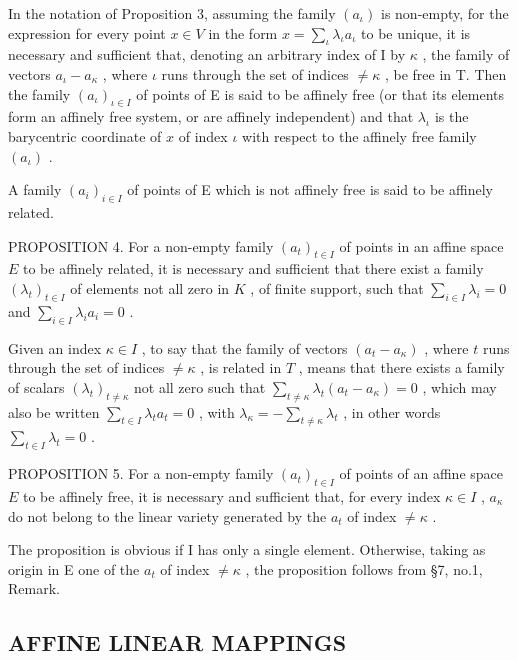 In the notation of Proposition 3, assuming the family \((a_{\iota})\) is non-empty, for the expression for every point \(x \in V\) in the form \(x = \sum_{\iota} \lambda_{\iota} a_{\iota}\) to be unique, it is necessary and sufficient that, denoting an arbitrary index of I by \(\kappa\) , the family of vectors \(a_{\iota} - a_{\kappa}\) , where \(\iota\) runs through the set of indices \(\neq \kappa\) , be free in T. Then the family \((a_{\iota})_{\iota \in I}\) of points of E is said to be affinely free (or that its elements form an affinely free system, or are affinely independent) and that \(\lambda_{\iota}\) is the barycentric coordinate of \(x\) of index \(\iota\) with respect to the affinely free family \((a_{\iota})\) .

A family \((a_{i})_{i\in I}\) of points of E which is not affinely free is said to be affinely related.

PROPOSITION 4. For a non-empty family \((a_{t})_{t\in I}\) of points in an affine space \(E\) to be affinely related, it is necessary and sufficient that there exist a family \((\lambda_t)_{t\in I}\) of elements not all zero in \(K\) , of finite support, such that \(\sum_{i\in I}\lambda_i = 0\) and \(\sum_{i\in I}\lambda_i a_i = 0\) .

Given an index \(\kappa \in I\) , to say that the family of vectors \((a_{t} - a_{\kappa})\) , where \(t\) runs through the set of indices \(\neq \kappa\) , is related in \(T\) , means that there exists a family of scalars \((\lambda_{t})_{t \neq \kappa}\) not all zero such that \(\sum_{t \neq \kappa} \lambda_{t}(a_{t} - a_{\kappa}) = 0\) , which may also be written \(\sum_{t \in I} \lambda_{t} a_{t} = 0\) , with \(\lambda_{\kappa} = -\sum_{t \neq \kappa} \lambda_{t}\) , in other words \(\sum_{t \in I} \lambda_{t} = 0\) .

PROPOSITION 5. For a non-empty family \((a_{t})_{t\in I}\) of points of an affine space \(E\) to be affinely free, it is necessary and sufficient that, for every index \(\kappa\in I\) , \(a_{\kappa}\) do not belong to the linear variety generated by the \(a_{t}\) of index \(\neq\kappa\) .

The proposition is obvious if I has only a single element. Otherwise, taking as origin in E one of the \(a_{t}\) of index \(\neq\kappa\) , the proposition follows from §7, no.1, Remark.

\subsection{AFFINE LINEAR MAPPINGS}

